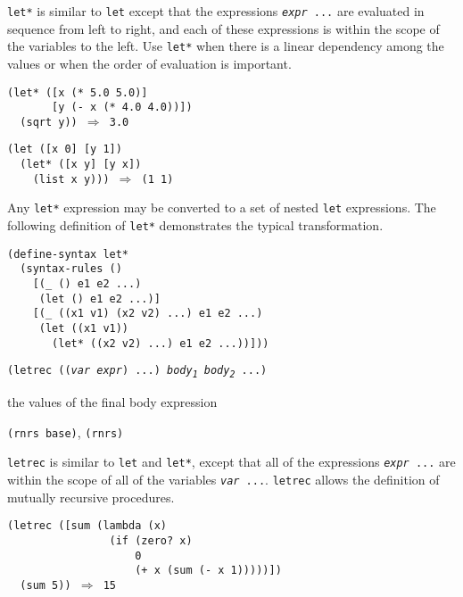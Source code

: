 \texttt{let*} is similar to \texttt{let} except that the
expressions \texttt{\textit{expr} ...} are evaluated in sequence
from left to right, and
each of these expressions is within the scope of the variables to the
left.
Use \texttt{let*} when there is a linear dependency among the values or
when the order of evaluation is important.

\begin{alltt}
(let* ([x (* 5.0 5.0)]
       [y (- x (* 4.0 4.0))])
  (sqrt y)) \(\Rightarrow\) 3.0

(let ([x 0] [y 1])
  (let* ([x y] [y x])
    (list x y))) \(\Rightarrow\) (1 1)
\end{alltt}


Any \texttt{let*} expression may be converted to a set of
\label{binding_s19}nested \texttt{let} expressions.
The following definition of \texttt{let*} demonstrates
the typical transformation.


\begin{alltt}
(define-syntax let*\label{binding_defn_let*}
  (syntax-rules ()
    [(\_{} () e1 e2 ...)
     (let () e1 e2 ...)]
    [(\_{} ((x1 v1) (x2 v2) ...) e1 e2 ...)
     (let ((x1 v1))
       (let* ((x2 v2) ...) e1 e2 ...))]))
\end{alltt}

\begin{description}

\label{binding_s20}\item[syntax] \texttt{(letrec ((\textit{var} \textit{expr}) ...) \textit{body\textsubscript{1}} \textit{body\textsubscript{2}} ...)}



\item[returns] the values of the final body expression


\item[libraries] \texttt{(rnrs base)}, \texttt{(rnrs)}
\end{description}

\texttt{letrec} is similar to \texttt{let} and \texttt{let*}, except
that all of the expressions \texttt{\textit{expr} ...}
are within the scope of all of the variables \texttt{\textit{var} ...}.
\texttt{letrec} allows the definition of
\label{binding_s21}mutually recursive procedures.

\begin{alltt}
(letrec ([sum (lambda (x)
                (if (zero? x)
                    0
                    (+ x (sum (- x 1)))))])
  (sum 5)) \(\Rightarrow\) 15
\end{alltt}


